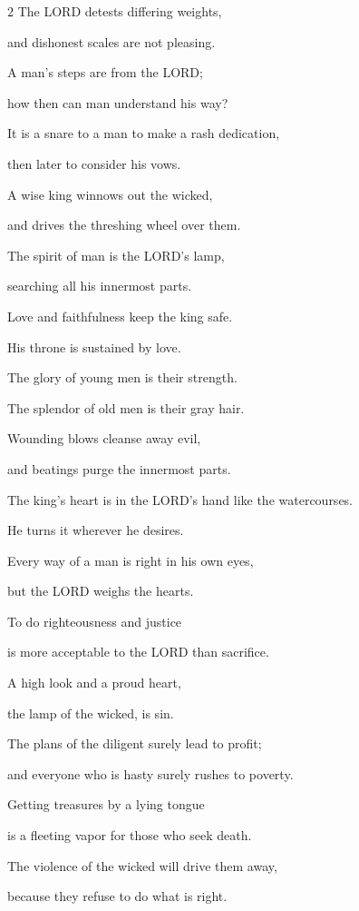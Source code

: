 \begin{multicols}{2}
\myverse{}The LORD detests differing weights,

and dishonest scales are not pleasing.


\myverse{}A man’s steps are from the LORD;

how then can man understand his way?


\myverse{}It is a snare to a man to make a rash dedication,

then later to consider his vows.


\myverse{}A wise king winnows out the wicked,

and drives the threshing wheel over them.


\myverse{}The spirit of man is the LORD’s lamp,

searching all his innermost parts.


\myverse{}Love and faithfulness keep the king safe.

His throne is sustained by love.


\myverse{}The glory of young men is their strength.

The splendor of old men is their gray hair.


\myverse{}Wounding blows cleanse away evil,

and beatings purge the innermost parts.


\mychapter{} \myverse*{}The king’s heart is in the LORD’s hand like the watercourses.

He turns it wherever he desires.


\myverse{}Every way of a man is right in his own eyes,

but the LORD weighs the hearts.


\myverse{}To do righteousness and justice

is more acceptable to the LORD than sacrifice.


\myverse{}A high look and a proud heart,

the lamp of the wicked, is sin.


\myverse{}The plans of the diligent surely lead to profit;

and everyone who is hasty surely rushes to poverty.


\myverse{}Getting treasures by a lying tongue

is a fleeting vapor for those who seek death.


\myverse{}The violence of the wicked will drive them away,

because they refuse to do what is right.



\end{multicols}
